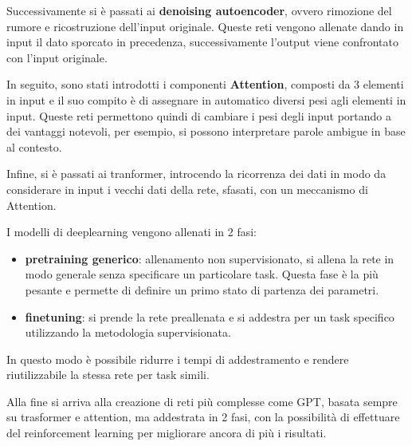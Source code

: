 Successivamente si è passati ai \textbf{denoising autoencoder}, ovvero rimozione
del rumore e ricostruzione dell'input originale. Queste reti vengono allenate dando
in input il dato sporcato in precedenza, successivamente l'output viene confrontato
con l'input originale.

In seguito, sono stati introdotti i componenti \textbf{Attention}, composti da 3
elementi in input e il suo compito è di assegnare in automatico diversi pesi
agli elementi in input. Queste reti permettono quindi di cambiare i pesi degli input
portando a dei vantaggi notevoli, per esempio, si possono interpretare parole ambigue
in base al contesto.

Infine, si è passati ai tranformer, introcendo la ricorrenza dei dati in modo da
considerare in input i vecchi dati della rete, sfasati, con un meccanismo di
Attention.

I modelli di deeplearning vengono allenati in 2 fasi:
\begin{itemize}
    \item \textbf{pretraining generico}: allenamento non supervisionato, si allena
          la rete in modo generale senza specificare un particolare task. Questa
          fase è la più pesante e permette di definire un primo stato di partenza
          dei parametri.
    \item \textbf{finetuning}: si prende la rete preallenata e si addestra per un
          task specifico utilizzando la metodologia supervisionata.
\end{itemize}
In questo modo è possibile ridurre i tempi di addestramento e rendere riutilizzabile
la stessa rete per task simili.

Alla fine si arriva alla creazione di reti più complesse come GPT, basata sempre
su trasformer e attention, ma addestrata in 2 fasi, con la possibilità di effettuare
del reinforcement learning per migliorare ancora di più i risultati.